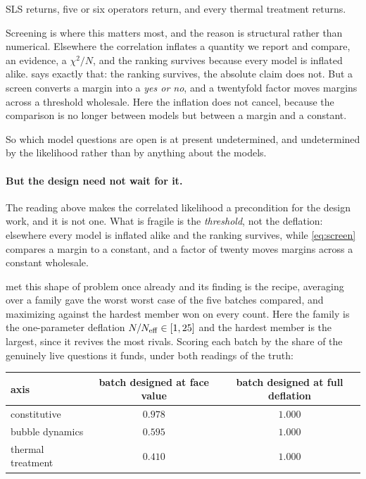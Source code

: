 \documentclass[10pt]{article}
\begin{document}
\noindent SLS returns, five or six operators return, and every thermal treatment returns.

Screening is where this matters most, and the reason is structural rather than numerical.
Elsewhere the correlation inflates a quantity we report and compare, an evidence, a
$\chi^2/N$, and the ranking survives because every model is inflated alike.
 says exactly that: the ranking survives, the absolute claim does not.
But a screen converts a margin into a \emph{yes or no}, and a twentyfold factor moves margins
across a threshold wholesale. Here the inflation does not cancel, because the comparison is no
longer between models but between a margin and a constant.

So which model questions are open is at present undetermined, and undetermined by the
likelihood rather than by anything about the models.

\paragraph{But the design need not wait for it.} The reading above makes the correlated
likelihood a precondition for the design work, and it is not one. What is fragile is the
\emph{threshold}, not the deflation: elsewhere every model is inflated alike and the ranking
survives, while \eqref{eq:screen} compares a margin to a constant, and a factor of twenty moves
margins across a constant wholesale.

 met this shape of problem once already and its finding is the recipe, averaging over a family gave the worst worst case of the five batches compared, and maximizing
against the hardest member won on every count. Here the family is the one-parameter deflation
$N/N_{\rm eff} \in [1, 25]$ and the hardest member is the largest, since it revives the most
rivals. Scoring each batch by the share of the genuinely live questions it funds, under both
readings of the truth:

\begin{center}
\begin{tabular}{lcc}
\toprule
axis & batch designed at face value & batch designed at full deflation \\
\midrule
constitutive & $0.978$ & $\mathbf{1.000}$ \\
bubble dynamics & $0.595$ & $\mathbf{1.000}$ \\
thermal treatment & $0.410$ & $\mathbf{1.000}$ \\
\bottomrule
\end{tabular}
\end{center}
\end{document}
